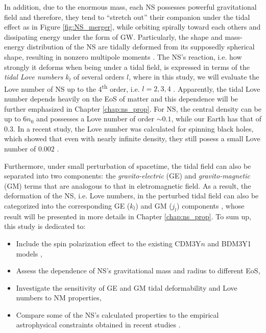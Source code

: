 In addition, due to the enormous mass, each \gls{NS} possesses powerful gravitational field and therefore, they tend to ``stretch out'' their companion under the tidal effect as in Figure \ref{fig:NS_merger}, while orbiting spirally toward each others and dissipating energy under the form of \gls{GW}. Particularly, the shape and mass-energy distribution of the \gls{NS} are tidally deformed from its supposedly spherical shape, resulting in nonzero multipole moments \citep{hinderer2008tidal,hinderer2010tidal,damour2009relativistic}. The \gls{NS}'s reaction, i.e. how strongly it deforms when being under a tidal field, is expressed in terms of the \emph{tidal Love numbers} $k_l$ of several orders $l$, where in this study, we will evaluate the Love number of \gls{NS} up to the 4\textsuperscript{th} order, i.e. $l=2,3,4$ \citep{perot2021role}. Apparently, the tidal Love number depends heavily on the \gls{EoS} of matter and this dependence will be further emphasized in Chapter \ref{chap:ns_prop}. For \gls{NS}, the central density can be up to $6n_0$ and possesses a Love number of order $\sim 0.1$, while our Earth has that of $0.3$. In a recent study, the Love number was calculated for spinning black holes, which showed that even with nearly infinite density, they still posess a small Love number of $0.002$ \citep{le2021spinning}.\par
Furthermore, under small perturbation of spacetime, the tidal field can also be separated into two components: the \emph{gravito-electric} (\gls{GE}) and \emph{gravito-magnetic} (\gls{GM}) terms \citep{damour2009relativistic} that are analogous to that in eletromagnetic field. As a result, the deformation of the \gls{NS}, i.e. Love numbers, in the perturbed tidal field can also be categorized into the corresponding \gls{GE} ($k_l$) and \gls{GM} ($j_l$) components \citep{perot2021role}, whose result will be presented in more details in Chapter \ref{chap:ns_prop}. To sum up, this study is dedicated to:
\begin{itemize}
        \item Include the spin polarization effect to the existing CDM3Y$n$ and BDM3Y1 models \citep{tan2021equation},
        \item Assess the dependence of \gls{NS}'s gravitational mass and radius to different \gls{EoS},
        \item Investigate the sensitivity of \gls{GE} and \gls{GM} tidal deformability and Love numbers to \gls{NM} properties,
        \item Compare some of the \gls{NS}'s calculated properties to the empirical astrophysical constraints obtained in recent studies \citep{abbott2018gw170817,xie2019bayesian}.
\end{itemize}
